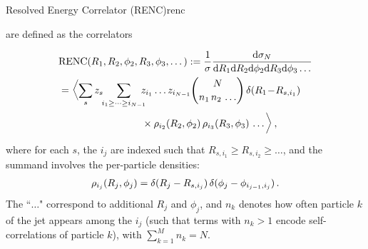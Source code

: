 \begin{definitionbox}{Resolved Energy Correlator (RENC)}{renc}

     are defined as the correlators

    \begin{align}
        \label{eq:renc}
        &\text{RENC}(R_1, R_2, \phi_2, R_3, \phi_3, \dots)
        := \frac{1}{\sigma}
        \frac{\dd \sigma_N}{\dd R_1 \dd R_2 \dd \phi_2 \dd R_3 \dd \phi_3 \dots} \notag
        \\
        &
        = \biggl\langle
        \sum_{\izero}
        z_{\izero}
        \!\!
        \sum_{i_1 \geq\dots\geq i_{N-1}}
        \!\!\!\!
        z_{i_1} \dots z_{i_{N-1}}
        \binom{N}{n_1\,n_2\, \dots}\,
        \delta
            (R_1 \!-\! R_{\izero,i_1}
        )
        \notag
        \\
        & \qquad\qquad\qquad\qquad
        \ \times
        \rho_{i_2}(R_2,\phi_2)\, \rho_{i_3}(R_3,\phi_3)\, \dots\biggr\rangle
        \, ,
    \end{align}
    where for each $s$, the $i_j$ are indexed such that $R_{s,i_1} \ge R_{s,i_2} \ge \ldots$, and the summand involves the per-particle densities:
    \begin{align}
        \rho_{i_j}(R_j, \phi_j)
        =
        \delta(
            R_j
            -
            R_{s,i_j}
        )\,
        \delta(
            \phi_j
            -
            \phi_{i_{j-1},i_j}
        )
    \,.\end{align}
    The ``$\dots$" correspond to additional  \(R_j\) and \(\phi_j\), and $n_k$ denotes how often particle $k$ of the jet appears among the $i_j$ (such that terms with $n_k>1$ encode self-correlations of particle $k$), with $\sum^M_{k=1} n_k = N$.

\end{definitionbox}


